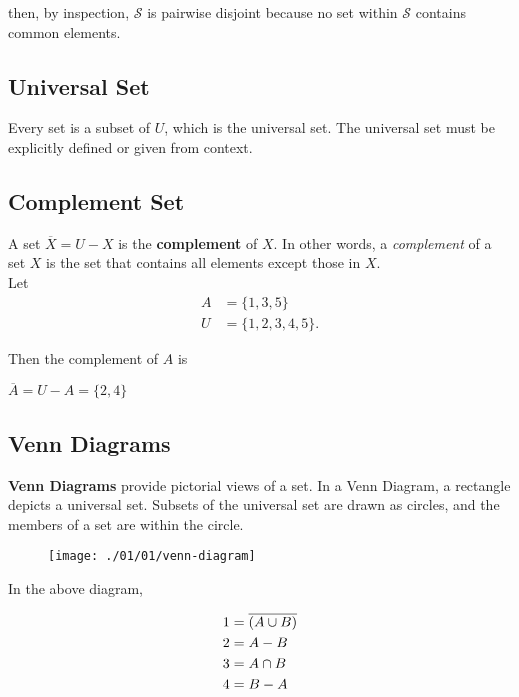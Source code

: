 then, by inspection, $\mathcal{S}$ is pairwise disjoint because no set within $\mathcal{S}$ contains common elements.

\subsection*{Universal Set}

Every set is a subset of $U$, which is the universal set.  The universal set must be explicitly defined or given from context.

\clearpage

\subsection*{Complement Set}

A set $\overline{X} = U - X$ is the \textbf{complement} of $X$.  In other words, a \textit{complement} of a set $X$ is the set that contains all elements except those in $X$.\\

Let
\begin{align*}
    A &= \{1, 3, 5\}\\
    U &= \{1, 2, 3, 4, 5\}.
\end{align*}

Then the complement of $A$ is

\begin{center}
    $\overline{A} = U - A = \{2, 4\}$
\end{center}

\subsection*{Venn Diagrams}

\textbf{Venn Diagrams} provide pictorial views of a set.  In a Venn Diagram, a rectangle depicts a universal set.  Subsets of the universal set are drawn as circles, and the members of a set are within the circle.

\begin{figure}[h]
\texttt{[image: ./01/01/venn-diagram]}
\centering
\end{figure}

In the above diagram,

\begin{align*}
    1 &= \overline{(A \cup B)}\\
    2 &= A - B\\
    3 &= A \cap B\\
    4 &= B - A\\
\end{align*}

